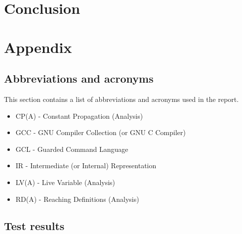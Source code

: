 \documentclass{report}
\begin{document}
\chapter{Conclusion}



\chapter{Appendix}

\section{Abbreviations and acronyms}

This section contains a list of abbreviations and acronyms used in
the report.

\begin{itemize}
\item CP(A) - Constant Propagation (Analysis)
\item GCC - GNU Compiler Collection (or GNU C Compiler)
\item GCL - Guarded Command Language
\item IR - Intermediate (or Internal) Representation
\item LV(A) - Live Variable (Analysis)
\item RD(A) - Reaching Definitions (Analysis)
\end{itemize}

\section{Test results}
\end{document}
